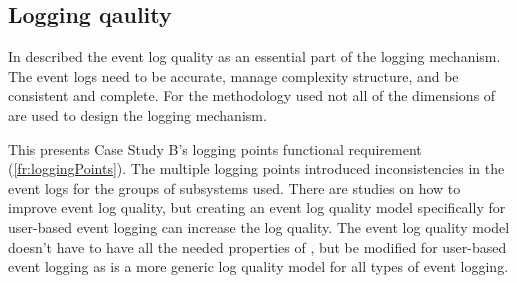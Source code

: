 \subsection{Logging qaulity}
In  described the event log quality as an essential part of the logging
mechanism. The event logs need to be accurate, manage complexity structure, and be consistent and
complete. For the methodology used not all of the dimensions of  are used
to design the logging mechanism.\par This presents Case Study B's logging points functional
requirement (\ref{fr:loggingPoints}). The multiple logging points introduced inconsistencies in the
event logs for the groups of subsystems used. There are studies on how to improve event log quality,
but creating an event log quality model specifically for user-based event logging can increase the
log quality. The event log quality model doesn't have to have all the needed properties of
, but be modified for user-based event logging as
 is a more generic log quality model for all types of event logging.

